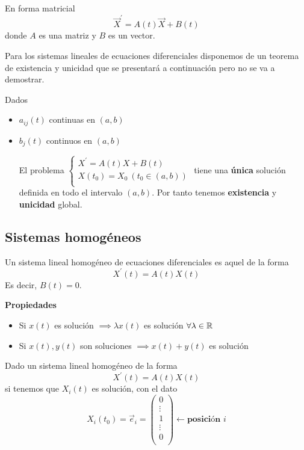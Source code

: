 En forma matricial
$$\vec{X}^\prime = A(t)\vec{X}+B(t)$$ donde $A$ es una matriz y $B$ es un vector.

Para los sistemas lineales de ecuaciones diferenciales disponemos de un teorema de existencia y unicidad que se presentará a continuación pero no se va a demostrar.

\begin{theorem}
Dados
\begin{itemize}
\item $a_{ij}(t)$ continuas en $(a,b)$
\item $b_j(t)$ continuos en $(a,b)$

El problema $
  \left\lbrace
  \begin{array}{l}
     X^\prime = A(t)X+B(t)\\
     X(t_0) = X_0\ (t_0\in(a,b))\\
  \end{array}
  \right.
$
tiene una \textbf{única} solución definida en todo el intervalo $(a,b)$. Por tanto tenemos \textbf{existencia} y \textbf{unicidad} global.
\end{itemize}
\end{theorem}

\subsection{Sistemas homogéneos}
\begin{definition}
Un sistema lineal homogéneo de ecuaciones diferenciales es aquel de la forma $$X^\prime(t) = A(t)X(t)$$ Es decir, $B(t) = 0$.
\end{definition}
\noindent\textbf{Propiedades}
\begin{itemize}
\item Si $x(t)$ es solución $\implies \lambda x(t)$ es solución $\forall \lambda \in \mathbb{R}$ 
\item Si $x(t), y(t)$ son soluciones $\implies x(t)+y(t)$ es solución
\end{itemize}

\obs 

Dado un sistema lineal homogéneo de la forma $$X^\prime(t) = A(t)X(t)$$ si tenemos que $X_i(t)$ es solución, con el dato $$X_i(t_0) = \vec{e}_i = \begin{pmatrix}
0\\
\vdots\\
1\\
\vdots\\
0\\
\end{pmatrix} \leftarrow \textbf{posición } i$$

